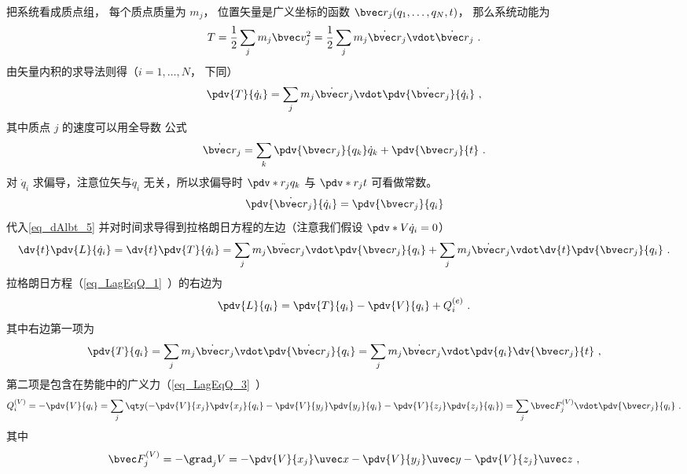 把系统看成质点组， 每个质点质量为 $m_j$， 位置矢量是广义坐标的函数 $\bvec r_j(q_1,\dots,q_N,t)$， 那么系统动能为
\begin{equation}
T = \frac12 \sum_j m_j \bvec v_j^2 = \frac12 \sum_j m_j \dot{\bvec r}_j \vdot \dot{\bvec r}_j~.
\end{equation}
由矢量内积的求导法则得（$i=1,\dots,N$， 下同）
\begin{equation}\label{eq_dAlbt_5}
\pdv{T}{\dot q_i} = \sum_j m_j \dot{\bvec r}_j \vdot \pdv{\dot{\bvec r}_j}{\dot q_i}~,
\end{equation}
其中质点 $j$ 的速度可以用全导数 公式
\begin{equation}
\dot{\bvec r}_j = \sum_k \pdv{\bvec r_j}{q_k} \dot q_k  + \pdv{\bvec r_j}{t}~.
\end{equation}
对 $\dot q_i$ 求偏导，注意位矢与$\dot q_i$ 无关，所以求偏导时 $\pdv*{r_j}{q_k}$ 与 $\pdv*{r_j}{t}$ 可看做常数。
\begin{equation}\label{eq_dAlbt_27}
\pdv{\dot{\bvec r}_j}{\dot q_i} = \pdv{\bvec r_j}{q_i}
\end{equation}
代入\autoref{eq_dAlbt_5} 并对时间求导得到拉格朗日方程的左边（注意我们假设 $\pdv*{V}{\dot q_i} = 0$）
\begin{equation}\label{eq_dAlbt_8}
\dv{t} \pdv{L}{\dot q_i} = \dv{t} \pdv{T}{\dot q_i} = \sum_j m_j \ddot{\bvec r}_j \vdot \pdv{\bvec r_j}{q_i}  + \sum_j m_j \dot{\bvec r}_j \vdot \dv{t} \pdv{\bvec r_j}{q_i}~.
\end{equation}
拉格朗日方程（\autoref{eq_LagEqQ_1}~）的右边为
\begin{equation}
\pdv{L}{q_i} = \pdv{T}{q_i} - \pdv{V}{q_i} + Q_i^{(e)}~.
\end{equation}
其中右边第一项为
\begin{equation}\label{eq_dAlbt_28}
\pdv{T}{q_i} = \sum_j m_j \dot{\bvec r}_j \vdot \pdv{\dot{\bvec r}_j}{q_i} = \sum_j m_j \dot{\bvec r}_j \vdot \pdv{q_i} \dv{\bvec r_j}{t}~,
\end{equation}
第二项是包含在势能中的广义力（\autoref{eq_LagEqQ_3}~）
\begin{equation}\label{eq_dAlbt_29}
Q_i^{(V)} = - \pdv{V}{q_i} = \sum_j \qty(-\pdv{V}{x_j} \pdv{x_j}{q_i} - \pdv{V}{y_j}\pdv{y_j}{q_i} - \pdv{V}{z_j} \pdv{z_j}{q_i}) = \sum_j \bvec F_j^{(V)} \vdot \pdv{\bvec r_j}{q_i}~.
\end{equation}
其中
\begin{equation}\label{eq_dAlbt_2}
\bvec F_j^{(V)} = - \grad_j V = -\pdv{V}{x_j}\uvec x - \pdv{V}{y_j}\uvec y - \pdv{V}{z_j} \uvec z~,
\end{equation}
